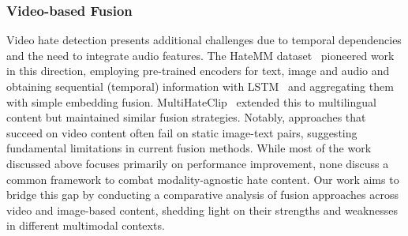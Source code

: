 \subsubsection{Video-based Fusion}
Video hate detection presents additional challenges due to temporal dependencies and the need to integrate audio features. The HateMM dataset~\citep{das2023hatemm} pioneered work in this direction, employing pre-trained encoders for text, image and audio and obtaining sequential (temporal) information with LSTM~\citep{hochreiter1997long} and aggregating them with simple embedding fusion. MultiHateClip~\citep{wang2024multihateclip} extended this to multilingual content but maintained similar fusion strategies. Notably, approaches that succeed on video content often fail on static image-text pairs, suggesting fundamental limitations in current fusion methods. While most of the work discussed above focuses primarily on performance improvement, none discuss a common framework to combat modality-agnostic hate content. Our work aims to bridge this gap by conducting a comparative analysis of fusion approaches across video and image-based content, shedding light on their strengths and weaknesses in different multimodal contexts.

